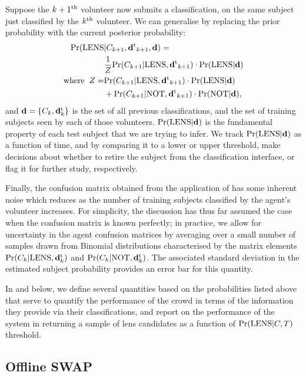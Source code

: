\documentclass[useAMS,usenatbib,a4paper]{mn2e}
\begin{document}
Suppose the $k+1^{\rm th}$ volunteer now submits a classification, on the same
subject just classified by the $k^{\rm th}$ volunteer. We can generalise
 by replacing the prior probability with the current
posterior probability:
\begin{align}
  \label{eq:app:update}
  {\rm Pr}({\rm LENS} & |C_{k+1},{\mathbf{d}^{\rm t}}_{k+1},{\mathbf{d}}) = \\
  & \frac{1}{Z} {\rm Pr}(C_{k+1}|{\rm LENS},{\mathbf{d}^{\rm t}}_{k+1}) \cdot {\rm Pr}({\rm LENS}|{\mathbf{d}}) \\ \notag
{\rm where}\;\; Z = & {\rm Pr}(C_{k+1}|{\rm LENS},{\mathbf{d}^{\rm t}}_{k+1})\cdot{\rm Pr}({\rm LENS}|{\mathbf{d}}) \\ \notag
      & + {\rm Pr}(C_{k+1}|{\rm NOT},{\mathbf{d}^{\rm t}}_{k+1})\cdot{\rm Pr}({\rm NOT}|{\mathbf{d}}), \notag
\end{align}
and ${\mathbf{d}} = \{C_k,{\mathbf{d}^{\rm t}_k}\}$ is the set of all previous
classifications, and the set of training subjects seen by each of those
volunteers.
${\rm Pr}({\rm LENS}|{\mathbf{d}})$ is the fundamental property of each test subject that
we are trying to infer. We track ${\rm Pr}({\rm LENS}|{\mathbf{d}})$ as a function of time,
and by comparing it to a lower or upper threshold, make decisions about
whether to retire the subject from the classification interface, or
flag it for further study, respectively.

Finally, the confusion matrix obtained from the application of
 has some inherent noise which reduces as the
number of training subjects classified by the agent's volunteer
increases. For simplicity, the discussion has thus far assumed the case
when the confusion matrix is known perfectly; in practice, we allow for
uncertainty in the agent confusion matrices by averaging over a small
number of samples drawn from Binomial distributions characterised by the
matrix elements ${\rm Pr}(C_k|{\rm LENS},{\mathbf{d}^{\rm t}_k})$ and  ${\rm Pr}(C_k|{\rm NOT},{\mathbf{d}^{\rm t}_k})$. The
associated standard deviation in the estimated subject probability
provides an error bar for this quantity.

In  and  below, we define several
quantities based on the probabilities listed above that serve to quantify the
performance of the crowd in terms of the information they provide via their
classifications, and report on the performance of the system in returning a
sample of lens candidates as a function of ${\rm Pr}({\rm LENS}|C,T)$ threshold.



\subsection{Offline SWAP}
\label{sec:swap:offline}
\end{document}
